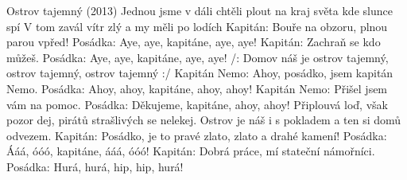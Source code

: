 \begin{TEXT}{Ostrov tajemný (2013)}
\SLOKA Jednou jsme v dáli chtěli plout
na kraj světa kde slunce spí
V tom zavál vítr zlý
a my měli po lodích
\INTERM Kapitán: Bouře na obzoru, plnou parou vpřed!
Posádka: Aye, aye, kapitáne, aye, aye!
Kapitán: Zachraň se kdo můžeš.
Posádka: Aye, aye, kapitáne, aye, aye!
\REFREN /: Domov náš je ostrov tajemný,
ostrov tajemný, ostrov tajemný :/
\INTERM Kapitán Nemo: Ahoy, posádko, jsem kapitán Nemo.
Posádka: Ahoy, ahoy, kapitáne, ahoy, ahoy!
Kapitán Nemo: Přišel jsem vám na pomoc.
Posádka: Děkujeme, kapitáne, ahoy, ahoy!
\REFRENHRAJ
\SLOKA Připlouvá loď, však pozor dej,
pirátů strašlivých se nelekej.
Ostrov je náš i s pokladem
a ten si domů odvezem.
\INTERM Kapitán: Posádko, je to pravé zlato, zlato a drahé kamení!
Posádka: Ááá, óóó, kapitáne, ááá, óóó!
Kapitán: Dobrá práce, mí stateční námořníci.
Posádka: Hurá, hurá, hip, hip, hurá!
\REFRENHRAJ
\end{TEXT}